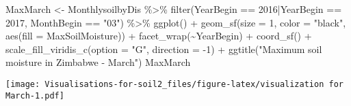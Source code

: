 \documentclass[
]{article}
\newenvironment{Shaded}{\begin{snugshade}}{\end{snugshade}}
\newcommand{\AttributeTok}[1]{\textcolor[rgb]{0.77,0.63,0.00}{#1}}
\newcommand{\DecValTok}[1]{\textcolor[rgb]{0.00,0.00,0.81}{#1}}
\newcommand{\FunctionTok}[1]{\textcolor[rgb]{0.00,0.00,0.00}{#1}}
\newcommand{\NormalTok}[1]{#1}
\newcommand{\OtherTok}[1]{\textcolor[rgb]{0.56,0.35,0.01}{#1}}
\newcommand{\SpecialCharTok}[1]{\textcolor[rgb]{0.00,0.00,0.00}{#1}}
\newcommand{\StringTok}[1]{\textcolor[rgb]{0.31,0.60,0.02}{#1}}
\begin{document}
\begin{Shaded}
\begin{Highlighting}[]
\NormalTok{MaxMarch }\OtherTok{\textless{}{-}}\NormalTok{ MonthlysoilbyDis }\SpecialCharTok{\%\textgreater{}\%} 
  \FunctionTok{filter}\NormalTok{(YearBegin }\SpecialCharTok{==} \DecValTok{2016}\SpecialCharTok{|}\NormalTok{YearBegin }\SpecialCharTok{==} \DecValTok{2017}\NormalTok{, MonthBegin }\SpecialCharTok{==} \StringTok{"03"}\NormalTok{) }\SpecialCharTok{\%\textgreater{}\%} 
  \FunctionTok{ggplot}\NormalTok{() }\SpecialCharTok{+}
  \FunctionTok{geom\_sf}\NormalTok{(}\AttributeTok{size =} \DecValTok{1}\NormalTok{, }\AttributeTok{color =} \StringTok{"black"}\NormalTok{, }\FunctionTok{aes}\NormalTok{(}\AttributeTok{fill =}\NormalTok{ MaxSoilMoisture)) }\SpecialCharTok{+}
  \FunctionTok{facet\_wrap}\NormalTok{(}\SpecialCharTok{\textasciitilde{}}\NormalTok{YearBegin) }\SpecialCharTok{+}
  \FunctionTok{coord\_sf}\NormalTok{() }\SpecialCharTok{+}
  \FunctionTok{scale\_fill\_viridis\_c}\NormalTok{(}\AttributeTok{option =} \StringTok{"G"}\NormalTok{, }\AttributeTok{direction =} \SpecialCharTok{{-}}\DecValTok{1}\NormalTok{) }\SpecialCharTok{+}
  \FunctionTok{ggtitle}\NormalTok{(}\StringTok{"Maximum soil moisture in Zimbabwe {-} March"}\NormalTok{)}
\NormalTok{MaxMarch}
\end{Highlighting}
\end{Shaded}

\texttt{[image: Visualisations-for-soil2\_files/figure-latex/visualization for March-1.pdf]}
\end{document}
